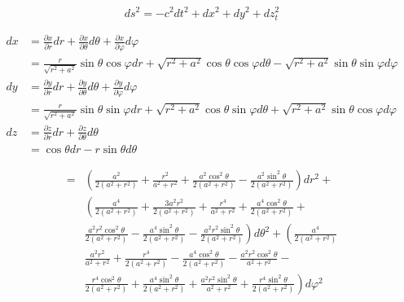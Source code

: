 $$
    d s^2=-c^2 d t^2+d x^2+d y^2+d z_t^2
$$



\begin{align}
    d x & =\frac{\partial x}{\partial r} d r+\frac{\partial x}{\partial \theta} d \theta+\frac{\partial x}{\partial \varphi} d \varphi                              \\
        & =\frac{r}{\sqrt{r^2+a^2}} \sin \theta \cos \varphi d r+\sqrt{r^2+a^2} \cos \theta \cos \varphi d \theta-\sqrt{r^2+a^2} \sin \theta \sin \varphi d \varphi \\
    d y & =\frac{\partial y}{\partial r} d r+\frac{\partial y}{\partial \theta} d \theta+\frac{\partial y}{\partial \varphi} d \varphi                              \\
        & =\frac{r}{\sqrt{r^2+a^2}} \sin \theta \sin \varphi d r+\sqrt{r^2+a^2} \cos \theta \sin \varphi d \theta+\sqrt{r^2+a^2} \sin \theta \cos \varphi d \varphi \\
    d z & =\frac{\partial z}{\partial r} d r+\frac{\partial z}{\partial \theta} d \theta                                                                            \\
        & =\cos \theta d r-r \sin \theta d \theta
\end{align}

\begin{equation}
    \begin{aligned}
        = & \left(\frac{a^2}{2\left(a^2+r^2\right)}+\frac{r^2}{a^2+r^2}+\frac{a^2 \cos ^2 \theta}{2\left(a^2+r^2\right)}-\frac{a^2 \sin ^2 \theta}{2\left(a^2+r^2\right)}\right) d r^2+                                                       \\
          & \left(\frac{a^4}{2\left(a^2+r^2\right)}+\frac{3 a^2 r^2}{2\left(a^2+r^2\right)}+\frac{r^4}{a^2+r^2}+\frac{a^4 \cos ^2 \theta}{2\left(a^2+r^2\right)}+\right.                                                                      \\
          & \left.\frac{a^2 r^2 \cos ^2 \theta}{2\left(a^2+r^2\right)}-\frac{a^4 \sin ^2 \theta}{2\left(a^2+r^2\right)}-\frac{a^2 r^2 \sin ^2 \theta}{2\left(a^2+r^2\right)}\right) d \theta^2+\left(\frac{a^4}{2\left(a^2+r^2\right)}\right. \\
          & \frac{a^2 r^2}{a^2+r^2}+\frac{r^4}{2\left(a^2+r^2\right)}-\frac{a^4 \cos ^2 \theta}{2\left(a^2+r^2\right)}-\frac{a^2 r^2 \cos ^2 \theta}{a^2+r^2}-                                                                                \\
          & \left.\frac{r^4 \cos ^2 \theta}{2\left(a^2+r^2\right)}+\frac{a^4 \sin ^2 \theta}{2\left(a^2+r^2\right)}+\frac{a^2 r^2 \sin ^2 \theta}{a^2+r^2}+\frac{r^4 \sin ^2 \theta}{2\left(a^2+r^2\right)}\right) d \varphi^2
    \end{aligned}
\end{equation}

